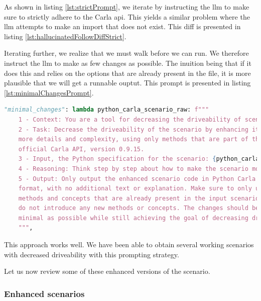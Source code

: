 As shown in listing \ref{lst:strictPrompt}, we iterate by instructing the \acrshort{llm} to make
sure to strictly adhere to the Carla \acrshort{api}. This yields a similar problem where the
\acrshort{llm} attempts to make an import that does not exist. This diff is presented in listing
\ref{lst:hallucinatedFollowDiffStrict}.

Iterating further, we realize that we must walk before we can run. We therefore instruct the
\acrshort{llm} to make as few changes as possible. The inuition being that if it does this and
relies on the options that are already present in the file, it is more plausible that we will get a
runnable ouptut. This prompt is presented in listing \ref{lst:minimalChangesPrompt}.

\begin{lstlisting}[language=python, label={lst:minimalChangesPrompt}, caption={A prompt instructing the \acrshort{llm} to make as few changes as possible to increase the likelyhood of it working without issues.}]
        "minimal_changes": lambda python_carla_scenario_raw: f"""
    1 - Context: You are a tool for decreasing the driveability of scenarios in the driving simulator Carla.
    2 - Task: Decrease the driveability of the scenario by enhancing it with
    more details and complexity, using only methods that are part of the
    official Carla API, version 0.9.15.
    3 - Input, the Python specification for the scenario: {python_carla_scenario_raw}
    4 - Reasoning: Think step by step about how to make the scenario more complex and less driveable, considering possible obstacles, traffic, weather, and other factors using only the official Carla API.
    5 - Output: Only output the enhanced scenario code in Python Carla scenario
    format, with no additional text or explanation. Make sure to only use
    methods and concepts that are already present in the input scenario, and
    do not introduce any new methods or concepts. The changes should be as
    minimal as possible while still achieving the goal of decreasing driveability.
    """,
\end{lstlisting}

This approach works well. We have been able to obtain several working scenarios with decreased
driveability with this prompting strategy.

Let us now review some of these enhanced versions of the scenario.

\subsubsection{Enhanced scenarios}

